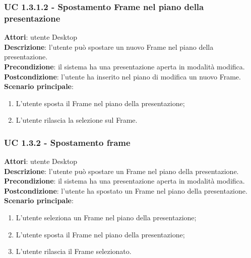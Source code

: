 \subsubsection{UC 1.3.1.2 - Spostamento Frame nel piano della presentazione}{
	\label{uc1.3.1.2}
	\textbf{Attori}: utente Desktop \\
	\textbf{Descrizione}: l'utente può spostare un nuovo Frame nel piano della presentazione. \\
	\textbf{Precondizione}: il sistema ha una presentazione aperta in modalità modifica.	\\
	\textbf{Postcondizione}: l'utente ha inserito nel piano di modifica un nuovo Frame.	\\
	\textbf{Scenario principale}:
	\begin{enumerate}
		\item L'utente sposta il Frame nel piano della presentazione;
		\item L'utente rilascia la selezione sul Frame.
	\end{enumerate}
	}
\subsubsection{UC 1.3.2 - Spostamento frame}{
	\label{uc1.3.2}
	\textbf{Attori}: utente Desktop \\
	\textbf{Descrizione}: l'utente può spostare un Frame nel piano della presentazione. \\
	\textbf{Precondizione}: il sistema ha una presentazione aperta in modalità modifica.	\\
	\textbf{Postcondizione}: l'utente ha spostato un Frame nel piano della presentazione.	\\
	\textbf{Scenario principale}:
	\begin{enumerate}
		\item L'utente seleziona un Frame nel piano della presentazione;
		\item L'utente sposta il Frame nel piano della presentazione;
		\item L'utente rilascia il Frame selezionato.
	\end{enumerate}
	}

